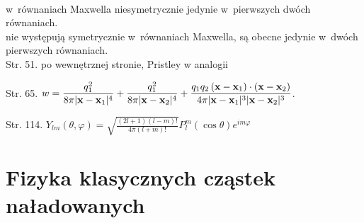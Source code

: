 \documentclass[a4paper,11pt]{article}
\begin{document}
\noindent
{} \\
\Jest  w~równaniach Maxwella niesymetrycznie jedynie w~pierwszych dwóch
równaniach. \\
\Powin nie występują symetrycznie w~równaniach Maxwella, są obecne jedynie
w~dwóch pierwszych równaniach. \\

Str. 51. po wewnętrznej stronie, Pristley w analogii

Str. 65. $\displaystyle w = \frac{ q^{ 2 }_{ 1 } }{ 8 \pi | \mathbf{x} - \mathbf{x}_{ 1 } |^{ 4 } } + \frac{ q^{ 2 }_{ 1 } }{ 8 \pi | \mathbf{x} - \mathbf{x}_{ 2 } |^{ 4 } } + \frac{ q_{ 1 } q_{ 2 } \, ( \mathbf{x} - \mathbf{x}_{ 1 } ) \cdot ( \mathbf{x} - \mathbf{x}_{ 2 } ) }{ 4 \pi | \mathbf{x} - \mathbf{x}_{ 1 } |^{ 3 } | \mathbf{x} - \mathbf{x}_{ 2 } |^{ 3 } }$.

Str. 114. $\displaystyle Y_{ l m }( \theta, \varphi ) = \sqrt{ \frac{ ( 2l + 1 ) ( l - m )! }{ 4 \pi ( l + m )! } } P^{ m }_{ l }( \cos \theta ) e^{ i m \varphi }$

\vspace{\spaceTwo}










\section{Fizyka klasycznych cząstek naładowanych}

\vspace{\spaceTwo}











\end{document}
